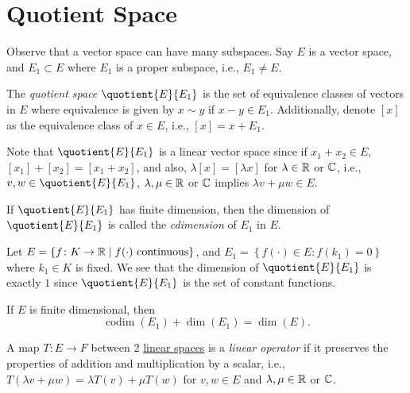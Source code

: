 \section{Quotient Space}
Observe that a vector space can have many subspaces. Say \(E\) is a vector space, and \(E_1 \subset E\) where \(E_1\) is a proper subspace, i.e., \(E_1 \neq E\).

\begin{definition}
	The \emph{quotient space} \(\quotient{E}{E_1} \) is the set of equivalence classes of vectors in \(E\) where equivalence is given by \(x\sim y\) if \(x - y\in E_1\). Additionally, denote \([x]\) as the equivalence class of \(x\in E\), i.e., \([x] = x + E_1\).
\end{definition}

Note that \(\quotient{E}{E_1} \) is a linear vector space since if \(x_1 + x_2\in E\), \([x_1] + [x_2] = [x_1 + x_2]\), and also, \(\lambda [x] = [\lambda x]\) for \(\lambda \in \mathbb{\MakeUppercase{r}} \) or \(\mathbb{\MakeUppercase{c}} \), i.e., \(v, w\in \quotient{E}{E_1} \), \(\lambda , \mu \in\mathbb{\MakeUppercase{r}} \) or \(\mathbb{\MakeUppercase{c}} \) implies \(\lambda v + \mu w\in E\).

\begin{definition}[Codimension]
	If \(\quotient{E}{E_1} \) has finite dimension, then the dimension of \(\quotient{E}{E_1} \) is called the \emph{cdimension} of \(E_1\) in \(E\).
\end{definition}

\begin{eg}
	Let \(E = \left\{ f\colon K\to \mathbb{\MakeUppercase{r}} \mid f(\cdot) \text{ continuous}  \right\} \), and \(E_1 = \left\{ f(\cdot)\in E\colon f(k_1) = 0 \right\} \) where \(k_1\in K\) is fixed. We see that the dimension of \(\quotient{E}{E_1} \) is exactly \(1\) since \(\quotient{E}{E_1} \) is the set of constant functions.
\end{eg}

\begin{theorem}
	If \(E\) is finite dimensional, then
	\[
		\mathop{\mathrm{codim}}(E_1) + \dim (E_1) = \dim(E).
	\]
\end{theorem}

\begin{definition}
	A map \(T\colon E\to F\) between 2 \hyperref[def:linear-vector-space]{linear spaces} is a \emph{linear operator} if it preserves the properties of addition and multiplication by a scalar, i.e., \(T(\lambda v + \mu w) = \lambda T(v) + \mu T(w)\) for \(v, w\in E\) and \(\lambda , \mu \in \mathbb{\MakeUppercase{r}}\) or \(\mathbb{\MakeUppercase{c}}\).
\end{definition}

